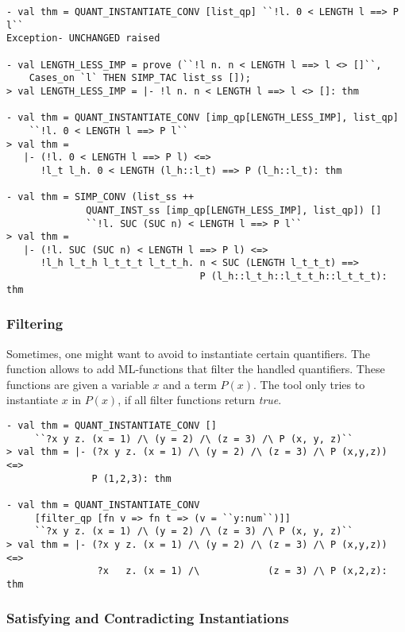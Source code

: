 \begin{session}
\begin{verbatim}
- val thm = QUANT_INSTANTIATE_CONV [list_qp] ``!l. 0 < LENGTH l ==> P l``
Exception- UNCHANGED raised

- val LENGTH_LESS_IMP = prove (``!l n. n < LENGTH l ==> l <> []``,
    Cases_on `l` THEN SIMP_TAC list_ss []);
> val LENGTH_LESS_IMP = |- !l n. n < LENGTH l ==> l <> []: thm

- val thm = QUANT_INSTANTIATE_CONV [imp_qp[LENGTH_LESS_IMP], list_qp]
    ``!l. 0 < LENGTH l ==> P l``
> val thm =
   |- (!l. 0 < LENGTH l ==> P l) <=>
      !l_t l_h. 0 < LENGTH (l_h::l_t) ==> P (l_h::l_t): thm

- val thm = SIMP_CONV (list_ss ++
              QUANT_INST_ss [imp_qp[LENGTH_LESS_IMP], list_qp]) []
              ``!l. SUC (SUC n) < LENGTH l ==> P l``
> val thm =
   |- (!l. SUC (SUC n) < LENGTH l ==> P l) <=>
      !l_h l_t_h l_t_t_t l_t_t_h. n < SUC (LENGTH l_t_t_t) ==>
                                  P (l_h::l_t_h::l_t_t_h::l_t_t_t): thm
\end{verbatim}
\end{session}


\subsubsection{Filtering}
Sometimes, one might want to avoid to instantiate certain quantifiers.
The function  allows to add ML-functions that filter the handled
quantifiers. These functions are given a variable $x$ and a term $P(x)$.
The tool only tries to instantiate $x$ in $P(x)$, if all filter functions
return \textit{true}.

\begin{session}
\begin{verbatim}
- val thm = QUANT_INSTANTIATE_CONV []
     ``?x y z. (x = 1) /\ (y = 2) /\ (z = 3) /\ P (x, y, z)``
> val thm = |- (?x y z. (x = 1) /\ (y = 2) /\ (z = 3) /\ P (x,y,z)) <=>
               P (1,2,3): thm

- val thm = QUANT_INSTANTIATE_CONV
     [filter_qp [fn v => fn t => (v = ``y:num``)]]
     ``?x y z. (x = 1) /\ (y = 2) /\ (z = 3) /\ P (x, y, z)``
> val thm = |- (?x y z. (x = 1) /\ (y = 2) /\ (z = 3) /\ P (x,y,z)) <=>
                ?x   z. (x = 1) /\            (z = 3) /\ P (x,2,z): thm
\end{verbatim}
\end{session}

\subsubsection{Satisfying and Contradicting Instantiations}


